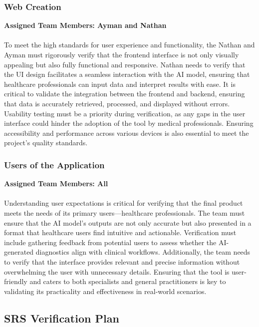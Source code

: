 \documentclass[12pt, titlepage]{article}
\begin{document}
\subsubsection{Web Creation}
\textbf{Assigned Team Members: Ayman and Nathan} \\\\
To meet the high standards for user experience and functionality, the Nathan and Ayman must rigorously verify that the frontend interface is not only visually appealing but also fully functional and responsive. Nathan needs to verify that the UI design facilitates a seamless interaction with the AI model, ensuring that healthcare professionals can input data and interpret results with ease. It is critical to validate the integration between the frontend and backend, ensuring that data is accurately retrieved, processed, and displayed without errors. Usability testing must be a priority during verification, as any gaps in the user interface could hinder the adoption of the tool by medical professionals. Ensuring accessibility and performance across various devices is also essential to meet the project’s quality standards.

\subsubsection{Users of the Application}
\textbf{Assigned Team Members: All} \\\\
Understanding user expectations is critical for verifying that the final product meets the needs of its primary users—healthcare professionals. The team must ensure that the AI model's outputs are not only accurate but also presented in a format that healthcare users find intuitive and actionable. Verification must include gathering feedback from potential users to assess whether the AI-generated diagnostics align with clinical workflows. Additionally, the team needs to verify that the interface provides relevant and precise information without overwhelming the user with unnecessary details. Ensuring that the tool is user-friendly and caters to both specialists and general practitioners is key to validating its practicality and effectiveness in real-world scenarios.


\subsection{SRS Verification Plan}
\end{document}
